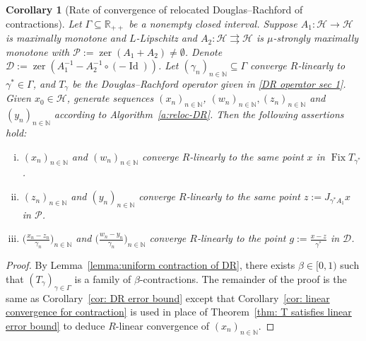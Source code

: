 \documentclass[a4paper,12pt]{article}
\newtheorem{corollary}[theorem]{Corollary}
\DeclareMathOperator{\Id}{Id}
\DeclareMathOperator{\Fix}{Fix}
\DeclareMathOperator{\zer}{zer}
\newcommand{\setto}{\rightrightarrows}
\begin{document}
\begin{corollary}[Rate of convergence of relocated Douglas--Rachford of contractions]\label{cor: relocated DR when contraction}
    Let $\Gamma\subseteq\mathbb{R}_{++}$ be a nonempty closed interval. Suppose $A_1\colon\mathcal{H}\to\mathcal{H}$ is maximally monotone and $L$-Lipschitz and $A_2\colon\mathcal{H}\setto\mathcal{H}$ is $\mu$-strongly maximally monotone with $\mathcal{P}:=\zer(A_1+A_2)\neq\emptyset$. Denote $\mathcal{D}:=\zer(A_1^{-1} - A_2^{-1} \circ (- \Id))$.  Let $(\gamma_n)_{n\in\mathbb{N}}\subseteq\Gamma$ converge $R$-linearly to $\gamma^*\in\Gamma$, and $T_\gamma$ be the Douglas--Rachford operator given in \eqref{DR operator sec 1}. Given $x_0\in\mathcal{H}$, generate sequences $(x_n)_{n\in\mathbb{N}}$, $(w_n)_{n\in\mathbb{N}}, (z_n)_{n\in\mathbb{N}}$ and $(y_n)_{n\in\mathbb{N}}$ according to Algorithm~\ref{a:reloc-DR}. Then the following assertions hold:
\begin{enumerate}[(i)]
    \item \label{cor:fixed-point-convergence for contraction} $(x_n)_{n\in\mathbb{N}}$ and $(w_n)_{n\in\mathbb{N}}$ converge  $R$-linearly to the same point $x$ in $\Fix T_{\gamma^*}$.
    \item \label{cor:primal-convergence for contraction} $(z_n)_{n\in\mathbb{N}}$ and $(y_n)_{n\in\mathbb{N}}$ converge  $R$-linearly to the same point $z := J_{\gamma^*A_1}x$ in $\mathcal{P}$.
    \item \label{cor:dual-convergence for contraction} $\bigl(\frac{x_n - z_n}{\gamma_n}\bigr)_{n\in\mathbb{N}}$ and $\bigl(\frac{w_n - y_n}{\gamma_n}\bigr)_{n\in\mathbb{N}}$  converge $R$-linearly to the  point $g := \frac{x - z}{\gamma^*}$ in $\mathcal{D}$.
\end{enumerate}
\end{corollary}
\begin{proof}
 By Lemma~\ref{lemma:uniform contraction of DR}, there exists $\beta\in[0,1)$ such that $(T_\gamma)_{\gamma\in\Gamma}$ is a family of $\beta$-contractions. The remainder of the proof is the same as Corollary~\ref{cor: DR error bound} except that Corollary~\ref{cor: linear convergence for contraction} is used in place of Theorem~\ref{thm: T satisfies linear error bound} to deduce $R$-linear convergence of $(x_n)_{n\in\mathbb{N}}$.
\end{proof}
\end{document}
